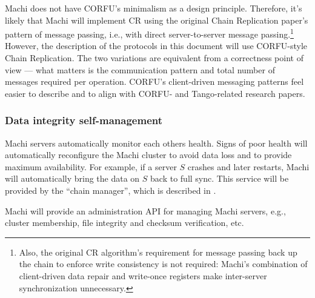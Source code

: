 \documentclass[preprint,10pt]{sigplanconf}
\begin{document}
Machi does not have CORFU's minimalism as a design principle.
Therefore, it's likely that Machi will implement CR using the original
Chain Replication \cite{chain-replication} paper's pattern of message
passing, i.e., with direct server-to-server message
passing.\footnote{Also, the original CR algorithm's requirement for
  message passing back up the chain to enforce write consistency is
  not required: Machi's combination of client-driven data repair and
  write-once registers make inter-server synchronization unnecessary.}
However, the
description of the protocols in this document will use CORFU-style
Chain Replication.  The two variations are equivalent from a
correctness point of view --- what matters is the communication
pattern and total number of messages required per operation.
CORFU's
client-driven messaging patterns feel easier to describe and to
align with CORFU- and Tango-related research papers.

\subsubsection{Data integrity self-management}
\label{sub:self-management}

Machi servers automatically monitor each others health.  Signs
of poor health will automatically reconfigure the Machi cluster
to avoid data loss and to provide maximum availability.
For example, if a server $S$ crashes and later
restarts, Machi will automatically bring the data on $S$ back to full sync.
This service will be provided by the ``chain manager'', which is
described in \cite{machi-chain-manager-design}.

Machi will provide an administration API for managing Machi servers, e.g.,
cluster membership, file integrity and checksum verification, etc.


\end{document}
